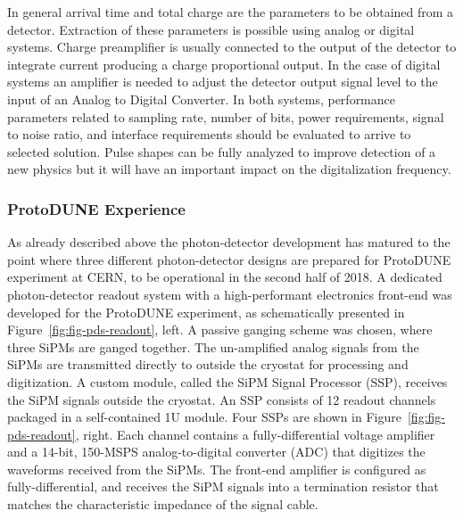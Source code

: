 In general arrival time and total charge are the parameters to be obtained from a detector. Extraction of these parameters 
is possible using analog or digital systems. Charge preamplifier is usually connected to the output of the detector to integrate 
current producing a charge proportional output. In the case of digital systems an amplifier is needed to adjust the detector output signal 
level to the input of an Analog to Digital Converter.  In both systems, performance parameters related  to sampling rate, number of bits, 
power requirements, signal to noise ratio, and interface requirements should be evaluated to arrive to selected solution.  
Pulse shapes can be fully analyzed to improve detection of a new physics but it will have an important impact on the digitalization frequency.


\subsubsection{ProtoDUNE Experience}

As already described above the photon-detector development has matured to the point where three different photon-detector designs are 
prepared for ProtoDUNE experiment at CERN, to be operational in the second half of 2018. 
A dedicated photon-detector readout system with a high-performant electronics front-end was developed for the ProtoDUNE experiment, 
as schematically presented in Figure~\ref{fig:fig-pds-readout}, left. A passive ganging scheme was chosen, where three SiPMs are ganged together.  
The un-amplified analog signals from the SiPMs are transmitted directly to outside the cryostat for processing and digitization. A custom module, 
called the SiPM Signal Processor (SSP), receives the SiPM signals outside the cryostat. An SSP consists of 12 readout channels packaged in 
a self-contained 1U module. Four SSPs are shown in Figure~\ref{fig:fig-pds-readout}, right. Each channel contains a fully-differential voltage 
amplifier and a 14-bit, 150-MSPS analog-to-digital converter (ADC) that digitizes the waveforms received from the SiPMs. The front-end amplifier 
is configured as fully-differential, and receives the SiPM signals into a termination resistor that matches the characteristic impedance of the signal cable. 


